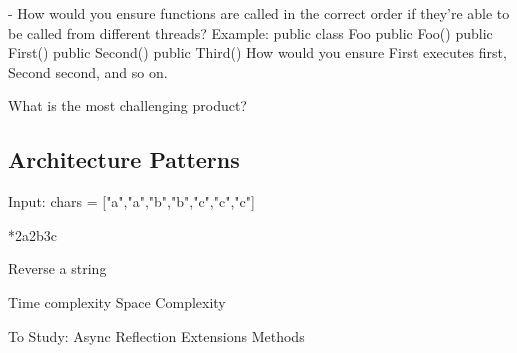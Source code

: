 \begin{multicols}{2}
- How would you ensure functions are called in the correct order if they're able to be called from different threads?
    Example:
        public class Foo{
            public Foo(){}
            public First(){}
            public Second(){}
            public Third(){}
        }
    How would you ensure First executes first, Second second, and so on.
	
	
What is the most challenging product?

\subsection{Architecture Patterns}


Input: chars = ["a","a","b","b","c","c","c"]

*2a2b3c

Reverse a string

Time complexity Space Complexity

To Study:
Async
Reflection 
Extensions Methods
\end{multicols}
